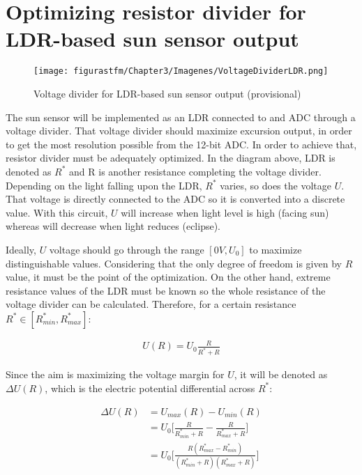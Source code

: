 \section{Optimizing resistor divider for LDR-based sun sensor output}

	\begin{figure}[H] 
				\centering
				\texttt{[image: figurastfm/Chapter3/Imagenes/VoltageDividerLDR.png]}
				\caption{Voltage divider for LDR-based sun sensor output (provisional)}      		
				\label{fig:dividerldr}
  		\end{figure}


The sun sensor will be implemented as an LDR connected to and ADC through a voltage divider. That voltage divider should maximize excursion output, in order to get the most resolution possible from the 12-bit ADC. In order to achieve that, resistor divider must be adequately optimized. In the diagram above, LDR is denoted as $R^*$ and R is another resistance completing the voltage divider. Depending on the light falling upon the LDR, $R^*$ varies, so does the voltage $U$. That voltage is directly connected to the ADC so it is converted into a discrete value. With this circuit, $U$ will increase when light level is high (facing sun) whereas will decrease when light reduces (eclipse).

Ideally, $U$ voltage should go through the range $[0 V,U_0]$ to maximize distinguishable values. Considering that the only degree of freedom is given by $R$ value, it must be the point of the optimization. On the other hand, extreme resistance values of the LDR must be known so the whole resistance of the voltage divider can be calculated. Therefore, for a certain resistance $R^* \in [R^*_{min}, R^*_{max}]$:

\begin{align}
U(R)=U_0 \frac{R}{R^* + R}
\end{align}

Since the aim is maximizing the voltage margin for $U$, it will be denoted as $\Delta U(R)$, which is the electric potential differential across $R^*$:

\begin{align*}
\Delta U(R) &= U_{max}(R) - U_{min}(R) \\
&= U_0 \Bigg[\frac{R}{R^*_{min} + R} - \frac{R}{R^*_{max} + R} \Bigg] \\
&= U_0 \Bigg[\frac{R(R^*_{max} - R^*_{min})}{(R^*_{min} + R)(R^*_{max} + R)} \Bigg] \\
\end{align*} %


